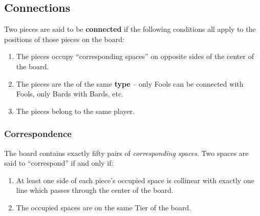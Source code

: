 %

\subsection{Connections}\label{connect}

Two pieces are said to be {\bf connected} if the following
conditions all apply to the positions of those pieces on the board:

\begin{enumerate}
  \item
    The pieces occupy ``corresponding spaces'' on opposite sides of the
    center of the board.

  \item
    The pieces are the of the same {\bf type} -- only
    Fools can be connected with Fools, only
    Bards with Bards, etc.

  \item
    The pieces belong to the same player.
\end{enumerate}

\subsubsection{Correspondence}\label{corresp}
The board contains exactly fifty pairs of {\sl corresponding spaces}.
Two spaces are said to ``correspond'' if and only if:
\begin{enumerate}
  \item
    At least one side of each piece's occupied space is
    collinear with exactly one line which passes through the
    center of the board.

  \item
    The occupied spaces are on the same Tier of the board.
\end{enumerate}

